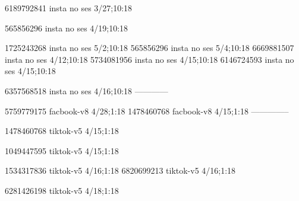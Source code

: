 
6189792841 insta no ses
3/27;10:18

565856296 insta no ses
4/19;10:18

1725243268 insta no ses
5/2;10:18
565856296 insta no ses
5/4;10:18
6669881507 insta no ses
4/12;10:18
5734081956 insta no ses
4/15;10:18
6146724593 insta no ses
4/15;10:18

6357568518 insta no ses
4/16;10:18
------------


5759779175 facbook-v8
4/28;1:18
1478460768 facbook-v8
4/15;1:18
--------------

1478460768 tiktok-v5
4/15;1:18

1049447595 tiktok-v5
4/15;1:18

1534317836 tiktok-v5
4/16;1:18
6820699213 tiktok-v5
4/16;1:18

6281426198 tiktok-v5
4/18;1:18
